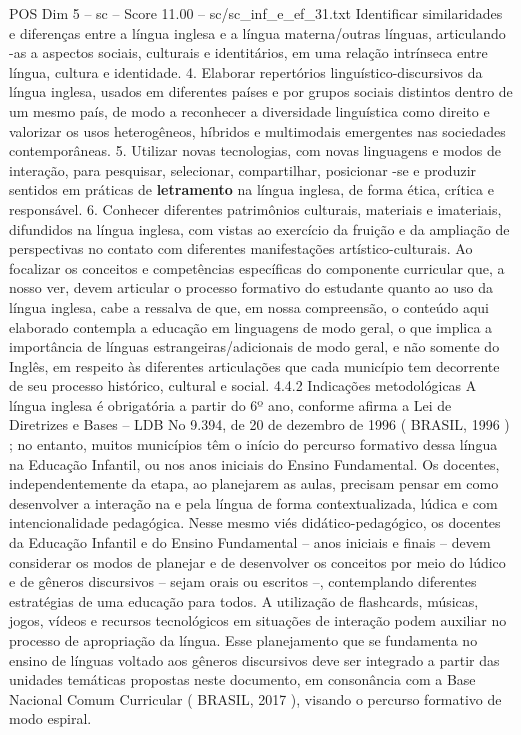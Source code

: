 \begin{textsample}{POS Dim 5 – sc – Score 11.00 – sc/sc\_inf\_e\_ef\_31.txt}
Identificar similaridades e diferenças entre a língua inglesa e a língua materna/outras línguas, articulando -as a aspectos sociais, culturais e identitários, em uma relação intrínseca entre língua, cultura e identidade. 4.
Elaborar repertórios linguístico-discursivos da língua inglesa, usados em diferentes países e por grupos sociais distintos dentro de um mesmo país, de modo a reconhecer a diversidade linguística como direito e valorizar os usos heterogêneos, híbridos e multimodais emergentes nas sociedades contemporâneas. 5.
Utilizar novas tecnologias, com novas linguagens e modos de interação, para pesquisar, selecionar, compartilhar, posicionar -se e produzir sentidos em práticas de \textbf{letramento} na língua inglesa, de forma ética, crítica e responsável. 6.
Conhecer diferentes patrimônios culturais, materiais e imateriais, difundidos na língua inglesa, com vistas ao exercício da fruição e da ampliação de perspectivas no contato com diferentes manifestações artístico-culturais.
Ao focalizar os conceitos e competências específicas do componente curricular que, a nosso ver, devem articular o processo formativo do estudante quanto ao uso da língua inglesa, cabe a ressalva de que, em nossa compreensão, o conteúdo aqui elaborado contempla a educação em linguagens de modo geral, o que implica a importância de línguas estrangeiras/adicionais de modo geral, e não somente do Inglês, em respeito às diferentes articulações que cada município tem decorrente de seu processo histórico, cultural e social. 4.4.2 Indicações metodológicas A língua inglesa é obrigatória a partir do 6º ano, conforme afirma a Lei de Diretrizes e Bases – LDB No 9.394, de 20 de dezembro de 1996 ( BRASIL, 1996 ) ; no entanto, muitos municípios têm o início do percurso formativo dessa língua na Educação Infantil, ou nos anos iniciais do Ensino Fundamental.
Os docentes, independentemente da etapa, ao planejarem as aulas, precisam pensar em como desenvolver a interação na e pela língua de forma contextualizada, lúdica e com intencionalidade pedagógica.
Nesse mesmo viés didático-pedagógico, os docentes da Educação Infantil e do Ensino Fundamental – anos iniciais e finais – devem considerar os modos de planejar e de desenvolver os conceitos por meio do lúdico e de gêneros discursivos – sejam orais ou escritos –, contemplando diferentes estratégias de uma educação para todos.
A utilização de flashcards, músicas, jogos, vídeos e recursos tecnológicos em situações de interação podem auxiliar no processo de apropriação da língua.
Esse planejamento que se fundamenta no ensino de línguas voltado aos gêneros discursivos deve ser integrado a partir das unidades temáticas propostas neste documento, em consonância com a Base Nacional Comum Curricular ( BRASIL, 2017 ), visando o percurso formativo de modo espiral.

\end{textsample}
